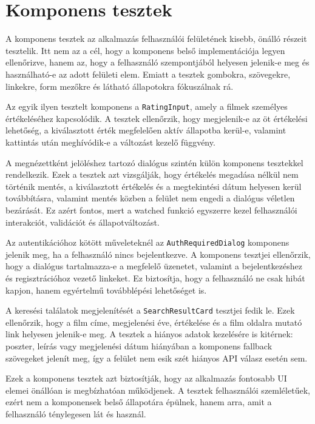 \section{Komponens tesztek}

A komponens tesztek az alkalmazás felhasználói felületének kisebb, önálló részeit tesztelik. Itt nem az a cél, hogy a komponens belső implementációja legyen ellenőrizve, hanem az, hogy a felhasználó szempontjából helyesen jelenik-e meg és használható-e az adott felületi elem. Emiatt a tesztek gombokra, szövegekre, linkekre, form mezőkre és látható állapotokra fókuszálnak rá.

Az egyik ilyen tesztelt komponens a \texttt{RatingInput}, amely a filmek személyes értékeléséhez kapcsolódik. A tesztek ellenőrzik, hogy megjelenik-e az öt értékelési lehetőség, a kiválasztott érték megfelelően aktív állapotba kerül-e, valamint kattintás után meghívódik-e a változást kezelő függvény.

A megnézettként jelöléshez tartozó dialógus szintén külön komponens tesztekkel rendelkezik. Ezek a tesztek azt vizsgálják, hogy értékelés megadása nélkül nem történik mentés, a kiválasztott értékelés és a megtekintési dátum helyesen kerül továbbításra, valamint mentés közben a felület nem engedi a dialógus véletlen bezárását. Ez azért fontos, mert a watched funkció egyszerre kezel felhasználói interakciót, validációt és állapotváltozást.

Az autentikációhoz kötött műveleteknél az \texttt{AuthRequiredDialog} komponens jelenik meg, ha a felhasználó nincs bejelentkezve. A komponens tesztjei ellenőrzik, hogy a dialógus tartalmazza-e a megfelelő üzenetet, valamint a bejelentkezéshez és regisztrációhoz vezető linkeket. Ez biztosítja, hogy a felhasználó ne csak hibát kapjon, hanem egyértelmű továbblépési lehetőséget is.

A keresési találatok megjelenítését a \texttt{SearchResultCard} tesztjei fedik le. Ezek ellenőrzik, hogy a film címe, megjelenési éve, értékelése és a film oldalra mutató link helyesen jelenik-e meg. A tesztek a hiányos adatok kezelésére is kitérnek: poszter, leírás vagy megjelenési dátum hiányában a komponens fallback szövegeket jelenít meg, így a felület nem esik szét hiányos API válasz esetén sem.

Ezek a komponens tesztek azt biztosítják, hogy az alkalmazás fontosabb UI elemei önállóan is megbízhatóan működjenek. A tesztek felhasználói szemléletűek, ezért nem a komponensek belső állapotára épülnek, hanem arra, amit a felhasználó ténylegesen lát és használ.

